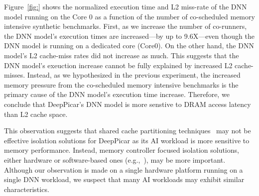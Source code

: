 Figure~\ref{fig:} shows the normalized execution time and L2 miss-rate
of the DNN model running on the Core 0 as a function of the number of
co-scheduled memory intensive synthetic benchmarks. First, as we
increase the number of co-runners, the DNN model's execution times are
increased---by up to 9.6X---even though the DNN model is running on a
dedicated core (Core0). On the other hand, the DNN model's L2
cache-miss rates did not increase as much. This suggests that
the DNN model's exeuction increase cannot be fully explained by
increased L2 cache-misses. Instead, as we hypothesized in the previous
experiment, the increased memory pressure from the co-scheduled memory
intensive benchmarks is the primary cause of the DNN model's execution
time increase. Therefore, we conclude that DeepPicar's DNN model is
more senstive to DRAM access latency than L2 cache space.

This observation suggests that shared cache partitioning
techniques~\cite{Gracioli2015,Kim2016} may not be effective isolation
solutions for DeepPicar as its AI workload is more sensitive to memory
performance. Instead, memory controller focused isolation solutions,
either hardware or software-based ones (e.g.,~\cite{Guo2017,Yun2013}),
may be more important. Although our observation is made on a single
hardware platform running on a single DNN workload, we suspect that
many AI workloads may exhibit similar characteristics.



